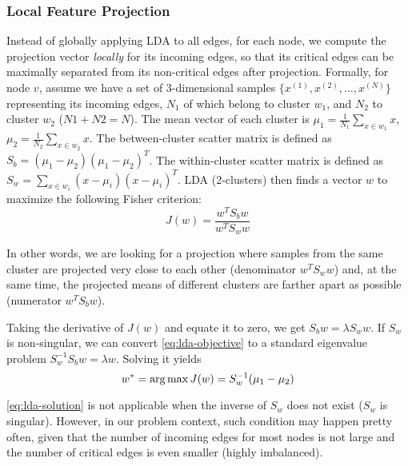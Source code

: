 \subsubsection{Local Feature Projection}
Instead of globally applying LDA to all edges, for each node, we compute the projection vector \emph{locally} for its incoming edges, so that its critical edges can be maximally separated from its non-critical edges after projection.
Formally, for node $v$, assume we have a set of 3-dimensional samples $\{x^{(1)}, x^{(2)}, \dots, x^{(N)}\}$ representing its incoming edges, $N_1$ of which belong to cluster $w_1$, and $N_2$ to cluster $w_2$ ($N1 + N2 = N$).
The mean vector of each cluster is $\mu_1 = \frac{1}{N_1}\sum_{x\in w_1} x$, $\mu_2 = \frac{1}{N_2}\sum_{x\in w_2} x$. 
The between-cluster scatter matrix is defined as $S_b = (\mu_1 - \mu_2)(\mu_1 - \mu_2)^T$.
The within-cluster scatter matrix is defined as $S_w = \sum_{x\in w_i}(x-\mu_i)(x-\mu_i)^T$.
LDA (2-clusters) then finds a vector $w$ to maximize the following Fisher criterion:
\begin{equation}
    \label{eq:lda-objective}
    J(w) = \frac{w^TS_bw}{w^TS_ww}
\end{equation}

In other words, we are looking for a projection where samples from the same cluster are projected very close to each other (denominator $w^TS_ww$) and, at the same time, the projected means of different clusters are farther apart as possible (numerator $w^TS_bw$).

Taking the derivative of $J(w)$ and equate it to zero, we get $S_bw =\lambda S_ww$. If $S_w$ is non-singular, we can convert \cref{eq:lda-objective} to a standard eigenvalue problem $S_w^{-1}S_bw = \lambda w$. Solving it yields
\begin{equation}
    \label{eq:lda-solution}
    w^* = \argmax J(w) = S_w^{-1}(\mu_1-\mu_2)
\end{equation}

\cref{eq:lda-solution} is not applicable when the inverse of $S_w$ does not exist (\ie $S_w$ is singular). 
However, in our problem context, such condition may happen pretty often, given that the number of incoming edges for most nodes is not large and the number of critical edges is even smaller (\ie highly imbalanced).

